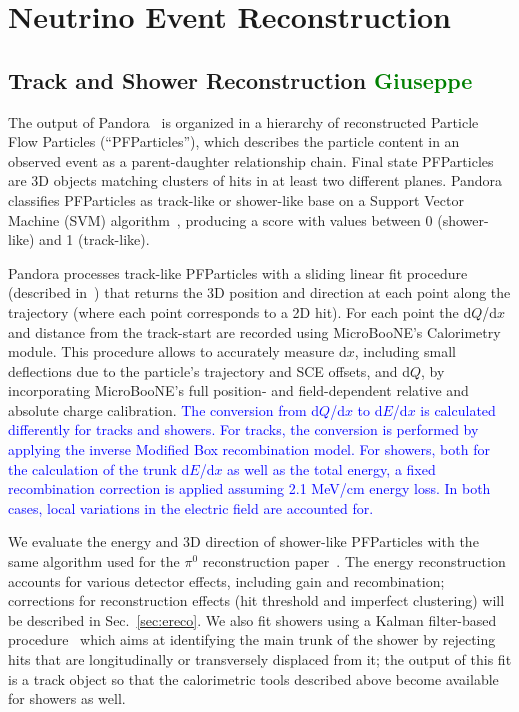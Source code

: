 \documentclass[a4paper]{article}
\begin{document}
\newpage

\section{Neutrino Event Reconstruction}

\subsection{Track and Shower Reconstruction \textcolor{green}{Giuseppe}}
\label{sec:tkshreco}
The output of Pandora~\cite{bib:pandoraub} is organized in a hierarchy of reconstructed Particle Flow Particles (``PFParticles''), which describes the particle content in an observed event as a parent-daughter relationship chain. Final state PFParticles are 3D objects matching clusters of hits in at least two different planes.
Pandora classifies PFParticles as track-like or shower-like base on a Support Vector Machine (SVM) algorithm~\cite{bib:tkshsvm}, producing a score with values between 0 (shower-like) and 1 (track-like).

Pandora processes track-like PFParticles with a sliding linear fit procedure (described in~\cite{bib:pandoraub}) that returns the 3D position and direction at each point along the trajectory (where each point corresponds to a 2D hit). For each point the d$Q$/d$x$ and distance from the track-start are recorded using MicroBooNE's Calorimetry module. This procedure allows to accurately measure d$x$, including small deflections due to the particle's trajectory and SCE offsets, and d$Q$, by incorporating MicroBooNE's full position- and field-dependent relative and absolute charge calibration. \textcolor{blue}{The conversion from d$Q$/d$x$ to d$E$/d$x$ is calculated differently for tracks and showers. For tracks, the conversion is performed by applying the inverse Modified Box recombination model. For showers, both for the calculation of the trunk d$E$/d$x$ as well as the total energy, a fixed recombination correction is applied assuming 2.1 MeV/cm energy loss. In both cases, local variations in the electric field are accounted for.}

We evaluate the energy and 3D direction of shower-like PFParticles with the same algorithm used for the $\pi^0$ reconstruction paper~\cite{bib:pi0reco}. The energy reconstruction accounts for various detector effects, including gain and recombination; corrections for reconstruction effects (hit threshold and imperfect clustering) will be described in Sec.~\ref{sec:ereco}. We also fit showers using a Kalman filter-based procedure~\cite{bib:shrtrackfitter} which aims at identifying the main trunk of the shower by rejecting hits that are longitudinally or transversely displaced from it; the output of this fit is a track object so that the calorimetric tools described above become available for showers as well.
\end{document}
